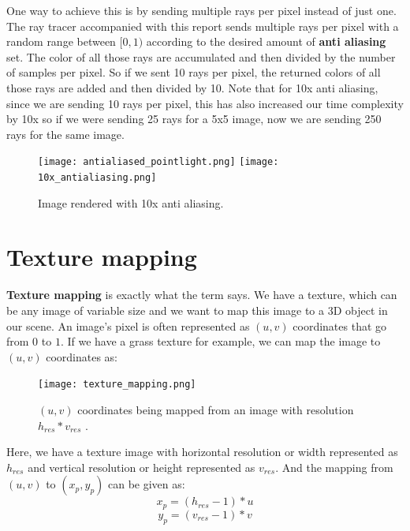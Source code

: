 \documentclass[11pt,a4paper]{article}
\begin{document}
	\noindent
	One way to achieve this is by sending multiple rays per pixel instead of just one. The ray tracer accompanied with this report sends multiple rays per pixel with a random range between $[0, 1)$ according to the desired amount of \textbf{anti aliasing} set. The color of all those rays are accumulated and then divided by the number of samples per pixel. So if we sent 10 rays per pixel, the returned colors of all those rays are added and then divided by 10. Note that for 10x anti aliasing, since we are sending 10 rays per pixel, this has also increased our time complexity by 10x so if we were sending 25 rays for a 5x5 image, now we are sending 250 rays for the same image.
	
	\begin{figure}[H]
		\centering
		\captionsetup{justification=centering}
		\texttt{[image: antialiased\_pointlight.png]}\quad
		\texttt{[image: 10x\_antialiasing.png]}\quad
		\caption{Image rendered with 10x anti aliasing.}
	\end{figure}
	
	\section{Texture mapping}
	
	\textbf{Texture mapping} is exactly what the term says. We have a texture, which can be any image of variable size and we want to map this image to a 3D object in our scene. An image's pixel is often represented as $(u, v)$ coordinates that go from $0$ to $1$. If we have a grass texture for example, we can map the image to $(u, v)$ coordinates as:
	\begin{figure}[H]
		\centering
		\captionsetup{justification=centering}
		\texttt{[image: texture\_mapping.png]}\quad
		\caption{$(u, v)$ coordinates being mapped from an image with resolution $h_{res}*v_{res}$ \protect\cite{suffern2016ray}.}
	\end{figure}
	\noindent
	Here, we have a texture image with horizontal resolution or width represented as $h_{res}$ and vertical resolution or height represented as $v_{res}$. And the mapping from $(u, v)$ to $(x_{p}, y_{p})$ can be given as:
	\begin{equation}
		x_{p} = (h_{res} - 1)*u
	\end{equation}
	\begin{equation}
		y_{p} = (v_{res} - 1)*v
	\end{equation}
	
\end{document}
